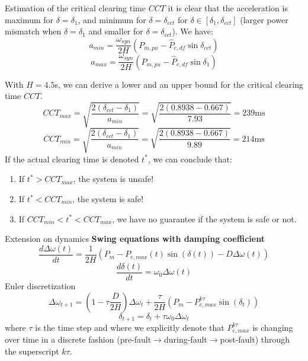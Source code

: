 \begin{frame}[allowframebreaks]{Estimation of the critical clearing time $CCT$}
it is clear that the acceleration is maximum for $\delta = \delta_1$, and minimum for $\delta = \delta_{cct}$ for $\delta \in [\delta_1,\delta_{cct}]$ (larger power mismatch when $\delta = \delta_1$ and smaller for $\delta = \delta_{cct}$).
We have:
$$a_{min} = \frac{\omega_{syn}}{2H}\left(P_{m,pu} - \hat{P}_{e,df}\sin \delta_{cct}\right)$$
$$a_{max} = \frac{\omega_{syn}}{2H}\left(P_{m,pu} - \hat{P}_{e,df}\sin \delta_{1}\right)$$

With $H = 4.5$s, we can derive a lower and an upper bound for the critical clearing time $CCT$.
$$CCT_{max} = \sqrt{\frac{2\left(\delta_{cct}-\delta_{1}\right)}{a_{min}}} = \sqrt{\frac{2\left(0.8938-0.667\right)}{7.93}} = 239 \text{ms}$$
$$CCT_{min} = \sqrt{\frac{2\left(\delta_{cct}-\delta_{1}\right)}{a_{min}}} = \sqrt{\frac{2\left(0.8938-0.667\right)}{9.89}} = 214 \text{ms}$$
If the actual clearing time is denoted $t^*$, we can conclude that:
\begin{enumerate}
    \item If $t^*>CCT_{max}$, the system is unsafe!
    \item If $t^*<CCT_{min}$, the system is safe!
    \item If $CCT_{min}<t^*<CCT_{max}$, we have no guarantee if the system is safe or not.
\end{enumerate}
\end{frame}

\begin{frame} {Extension on dynamics}
\textbf{Swing equations with damping coefficient}
$$\frac{d\Delta \omega(t)}{dt} = \frac{1}{2H}\left(P_m - P_{e,max}(t) \sin (\delta(t)) - D \Delta \omega(t) \right)$$
$$\frac{d\delta(t)}{dt} = \omega_0 \Delta \omega(t)$$
Euler discretization
$$\Delta \omega_{t+1} = (1-\tau \frac{D}{2H})\Delta \omega_{t} + \frac{\tau}{2H}\left(P_m-P_{e,max}^{k \tau}\sin (\delta_{t})\right)$$
$$\delta_{t+1} = \delta_{t} + \tau\omega_0\Delta \omega_t$$
where $\tau$ is the time step and where we explicitly denote that $P_{e,max}^{k \tau}$ is changing over time in a discrete fashion (pre-fault$\rightarrow$during-fault$\rightarrow$post-fault) through the superscript $k \tau$.
\end{frame}

